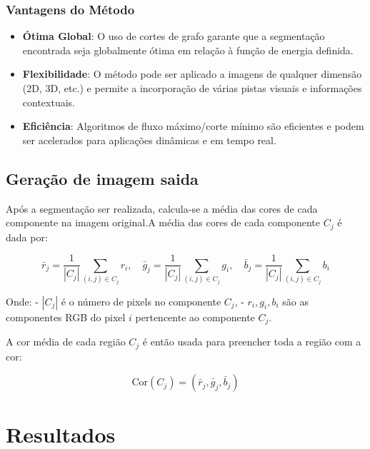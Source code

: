\documentclass[12pt]{article}
\begin{document}
\subsubsection{Vantagens do Método}

\begin{itemize}
    \item \textbf{Ótima Global}: O uso de cortes de grafo garante que a segmentação encontrada seja globalmente ótima em relação à função de energia definida.
    \item \textbf{Flexibilidade}: O método pode ser aplicado a imagens de qualquer dimensão (2D, 3D, etc.) e permite a incorporação de várias pistas visuais e informações contextuais.
    \item \textbf{Eficiência}: Algoritmos de fluxo máximo/corte mínimo são eficientes e podem ser acelerados para aplicações dinâmicas e em tempo real.
\end{itemize}


\subsection{Geração de imagem saida}
Após a segmentação ser realizada, calcula-se a média das cores de cada componente na imagem original.A média das cores de cada componente \( C_j \) é dada por:

\[
\bar{r}_j = \frac{1}{|C_j|} \sum_{(i, j) \in C_j} r_i, \quad \bar{g}_j = \frac{1}{|C_j|} \sum_{(i, j) \in C_j} g_i, \quad \bar{b}_j = \frac{1}{|C_j|} \sum_{(i, j) \in C_j} b_i
\]

Onde:
- \( |C_j| \) é o número de pixels no componente \( C_j \),
- \( r_i, g_i, b_i \) são as componentes RGB do pixel \( i \) pertencente ao componente \( C_j \).

A cor média de cada região \( C_j \) é então usada para preencher toda a região com a cor:

\[
\text{Cor}(C_j) = (\bar{r}_j, \bar{g}_j, \bar{b}_j)
\]



\section{Resultados}
\end{document}
